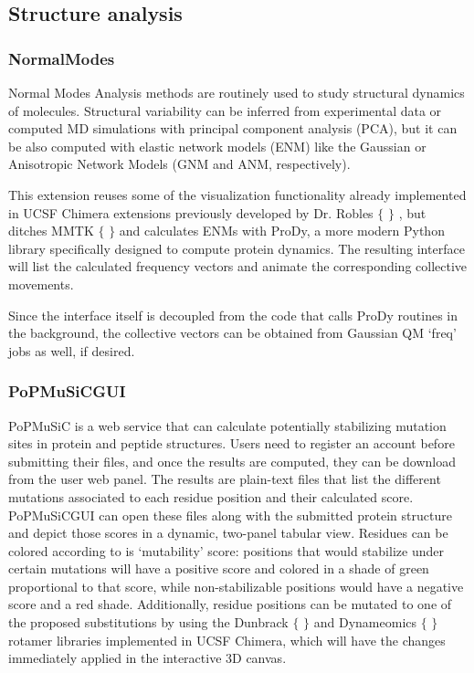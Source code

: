 \subsection{Structure analysis}
\subsubsection{NormalModes}
Normal Modes Analysis methods are routinely used to study structural dynamics of molecules. Structural variability can be inferred from experimental data or computed MD simulations with principal component analysis (PCA), but it can be also computed with elastic network models (ENM) like the Gaussian or Anisotropic Network Models (GNM and ANM, respectively).

This extension reuses some of the visualization functionality already implemented in UCSF Chimera extensions previously developed by Dr. Robles $ \{ $ $ \} $ , but ditches MMTK $ \{ $ $ \} $  and calculates ENMs with ProDy, a more modern Python library specifically designed to compute protein dynamics. The resulting interface will list the calculated frequency vectors and animate the corresponding collective movements.

Since the interface itself is decoupled from the code that calls ProDy routines in the background, the collective vectors can be obtained from Gaussian QM ‘freq’ jobs as well, if desired.

\subsubsection{PoPMuSiCGUI}
PoPMuSiC is a web service that can calculate potentially stabilizing mutation sites in protein and peptide structures. Users need to register an account before submitting their files, and once the results are computed, they can be download from the user web panel. The results are plain-text files that list the different mutations associated to each residue position and their calculated score. PoPMuSiCGUI can open these files along with the submitted protein structure and depict those scores in a dynamic, two-panel tabular view. Residues can be colored according to is ‘mutability’ score: positions that would stabilize under certain mutations will have a positive score and colored in a shade of green proportional to that score, while non-stabilizable positions would have a negative score and a red shade. Additionally, residue positions can be mutated to one of the proposed substitutions by using the Dunbrack $ \{ $ $ \} $  and Dynameomics $ \{ $ $ \} $  rotamer libraries implemented in UCSF Chimera, which will have the changes immediately applied in the interactive 3D canvas.



